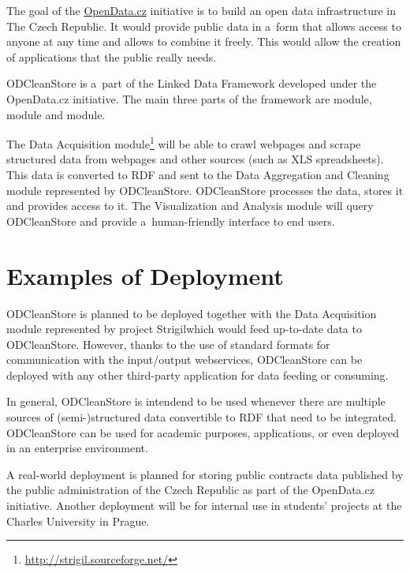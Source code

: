 The goal of the \href{http://opendata.cz}{OpenData.cz} initiative is to build an open data infrastructure in The Czech Republic. It would provide public data in a~form that allows access to anyone at any time and allows to combine it freely. This would allow the creation of applications that the public really needs.

ODCleanStore is a~part of the Linked Data Framework developed under the OpenData.cz initiative. The main three parts of the framework are  module,  module and  module.


The Data Acquisition module\footnote{\url{http://strigil.sourceforge.net/}} will be able to crawl webpages and scrape structured data from webpages and other sources (such as XLS spreadsheets). This data is converted to RDF and sent to the Data Aggregation and Cleaning module represented by ODCleanStore. ODCleanStore processes the data, stores it and provides access to it. The Visualization and Analysis module will query ODCleanStore and provide a~human-friendly interface to end users.


\section{Examples of Deployment}

ODCleanStore is planned to be deployed together with the Data Acquisition module represented by project Strigil\footnotemark[\thefootnote] which would feed up-to-date data to ODCleanStore. However, thanks to the use of standard formats for communication with the input/output webservices, ODCleanStore can be deployed with any other third-party application for data feeding or consuming.

In general, ODCleanStore is intendend to be used whenever there are multiple sources of (semi-)structured data convertible to RDF that need to be integrated. ODCleanStore can be used for academic purposes,  applications, or even deployed in an enterprise environment.

A real-world deployment is planned for storing public contracts data published by the public administration of the Czech Republic as part of the OpenData.cz initiative. Another deployment will be for internal use in students' projects at the Charles University in Prague.


